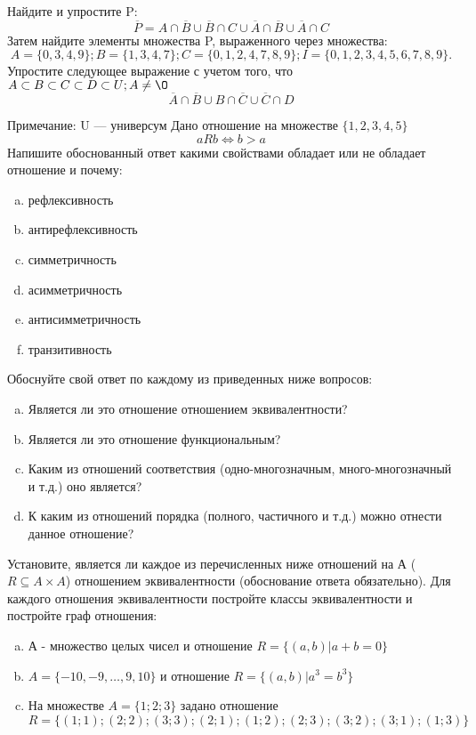 \documentclass[10pt]{exam}
\begin{document}
\begin{questions}
\question
Найдите и упростите P:
\begin{equation*}
\overline{P} = A \cap \overline{B} \cup \overline{B} \cap C \cup \overline{A} \cap \overline{B} \cup \overline{A} \cap C
\end{equation*}
Затем найдите элементы множества P, выраженного через множества:
\begin{equation*}
A = \{0, 3, 4, 9\}; 
B = \{1, 3, 4, 7\};
C = \{0, 1, 2, 4, 7, 8, 9\};
I = \{0, 1, 2, 3, 4, 5, 6, 7, 8, 9\}.
\end{equation*}\question
Упростите следующее выражение с учетом того, что $A\subset B \subset C \subset D \subset U; A \neq \O$
\begin{equation*}
\overline{A} \cap \overline{B} \cup B \cap \overline{C} \cup \overline{C} \cap D
\end{equation*}

Примечание: U — универсум\question
Дано отношение на множестве $\{1, 2, 3, 4, 5\}$ 
\begin{equation*}
aRb \iff b > a
\end{equation*}
Напишите обоснованный ответ какими свойствами обладает или не обладает отношение и почему:   
\begin{enumerate} [a)]\setcounter{enumi}{0}
\item рефлексивность
\item антирефлексивность
\item симметричность
\item асимметричность
\item антисимметричность
\item транзитивность
\end{enumerate}

Обоснуйте свой ответ по каждому из приведенных ниже вопросов:
\begin{enumerate} [a)]\setcounter{enumi}{0}
    \item Является ли это отношение отношением эквивалентности?
    \item Является ли это отношение функциональным?
    \item Каким из отношений соответствия (одно-многозначным, много-многозначный и т.д.) оно является?
    \item К каким из отношений порядка (полного, частичного и т.д.) можно отнести данное отношение?
\end{enumerate}

\question
Установите, является ли каждое из перечисленных ниже отношений на А ($R \subseteq A \times A$) отношением эквивалентности (обоснование ответа обязательно). Для каждого отношения эквивалентности 
постройте классы эквивалентности и постройте граф отношения:
\begin{enumerate}[a)]\setcounter{enumi}{0}
\item А - множество целых чисел и отношение $R = \{(a,b)|a + b = 0\}$
\item $A = \{-10, -9, …, 9, 10\}$ и отношение $R = \{(a,b)|a^{3} = b^{3}\}$
\item На множестве $A = \{1; 2; 3\}$ задано отношение $R = \{(1; 1); (2; 2); (3; 3); (2; 1); (1; 2); (2; 3); (3; 2); (3; 1); (1; 3)\}$


\end{enumerate}
\end{questions}
\end{document}
